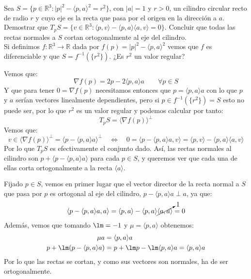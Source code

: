 \begin{ejercicio}
    Sea $S = \{p\in \mathbb{R}^3 : |p|^2 - \langle p,a \rangle^2 = r^2\}$, con $|a| =1$ y $r>0$, un cilindro circular recto de radio $r$ y cuyo eje es la recta que pasa por el origen en la dirección a $a$. Demostrar que $T_pS = \{v\in \mathbb{R}^3 : \langle p,v \rangle -\langle p,a \rangle \langle a,v \rangle =0\}$. Concluir que todas las rectas normales a $S$ cortan ortogonalmente al eje del cilindro.\\

    \noindent
    Si definimos $f:\mathbb{R}^3\to\mathbb{R}$ dada por $f(p) = |p|^2 - \langle p,a \rangle^2$ vemos que $f$ es diferenciable y que $S = f^{-1}(\{r^2\})$. ¿Es $r^2$ un valor regular?

    \noindent
    Vemos que:
    \begin{equation*}
        \nabla f(p) = 2p - 2\langle p,a \rangle a \qquad \forall p\in S
    \end{equation*}
    Y que para tener $0 = \nabla f(p)$ necesitamos entonces que $p = \langle p,a \rangle a$ con lo que $p$ y $a$ serían vectores linealmente dependientes, pero si $p\in f^{-1}(\{r^2\}) = S$ esto no puede ser, por lo que $r^2$ es un valor regular y podemos calcular por tanto:
    \begin{equation*}
        T_pS = \langle \nabla f(p) \rangle^\perp
    \end{equation*}
    Vemos que:
    \begin{equation*}
        v\in \langle \nabla f(p) \rangle^\perp = \langle p-\langle p,a \rangle a \rangle^\perp \quad\Longleftrightarrow\quad 0 = \langle p-\langle p,a \rangle a,v \rangle = \langle p,v \rangle -\langle p,a \rangle \langle a,v \rangle 
    \end{equation*}
    Por lo que $T_pS$ es efectivamente el conjunto dado. Así, las rectas normales al cilindro son $p + \langle p-\langle p,a \rangle a \rangle $ para cada $p\in S$, y queremos ver que cada una de ellas corta ortogonalmente a la recta $\langle a \rangle $.

    Fijado $p\in S$, vemos en primer lugar que el vector director de la recta normal a $S$ que pasa por $p$ es ortogonal al eje del cilindro, $p-\langle p,a \rangle a\perp a$, ya que:
    \begin{equation*}
        \langle p-\langle p,a \rangle a,a \rangle = \langle p,a \rangle - \langle p,a \rangle \cancelto{1}{\langle a,a \rangle } = 0
    \end{equation*}
    Además, vemos que tomando $\lm = -1$ y $\mu = \langle p,a \rangle $ obtenemos:
    \begin{align*}
        \mu a &= \langle p,a \rangle a \\
        p+\lm(p-\langle p,a \rangle a) &= p + \lm p - \lm \langle p,a \rangle a = \langle p,a \rangle a
    \end{align*}
    Por lo que las rectas se cortan, y como sus vectores son normales, ha de ser ortogonalmente.
\end{ejercicio}


